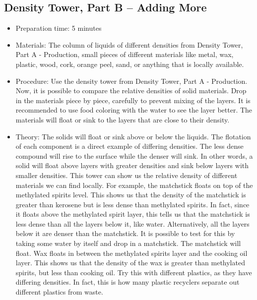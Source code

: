 \subsection{Density Tower, Part B – Adding More}
\begin{itemize}
\item{Preparation time: 5 minutes}
\item{Materials: The column of liquids of different densities from Density Tower, Part A - Production, small pieces of different materials like metal, wax, plastic, wood, cork, orange peel, sand, or anything that is locally available.}
\item{Procedure: Use the density tower from Density Tower, Part A - Production. Now, it is possible to compare the relative densities of solid materials. Drop in the materials piece by piece, carefully to prevent mixing of the layers. It is recommended to use food coloring with the water to see the layer better. The materials will float or sink to the layers that are close to their density.  }
\item{Theory: The solids will float or sink above or below the liquids. The flotation of each component is a direct example of differing densities. The less dense compound will rise to the surface while the denser will sink. In other words, a solid will float above layers with greater densities and sink below layers with smaller densities. This tower can show us the relative density of different materials we can find locally. For example, the matchstick floats on top of the methylated spirits level. This shows us that the density of the matchstick is greater than kerosene but is less dense than methylated spirits. In fact, since it floats above the methylated spirit layer, this tells us that the matchstick is less dense than all the layers below it, like water. Alternatively, all the layers below it are denser than the matchstick. It is possible to test for this by taking some water by itself and drop in a matchstick. The matchstick will float. Wax floats in between the methylated spirits layer and the cooking oil layer. This shows us that the density of the wax is greater than methylated spirits, but less than cooking oil. Try this with different plastics, as they have differing densities. In fact, this is how many plastic recyclers separate out different plastics from waste.}
\end{itemize}

